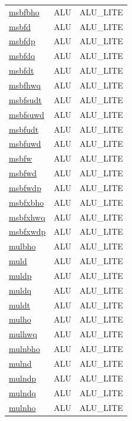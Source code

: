 \begin{small}
\begin{longtable}[l]{l l l}
\hyperlink{lvx.msbfbho}{msbfbho} & ALU & ALU\_LITE \\ 
\hyperlink{lvx.msbfd}{msbfd} & ALU & ALU\_LITE \\ 
\hyperlink{lvx.msbfdp}{msbfdp} & ALU & ALU\_LITE \\ 
\hyperlink{lvx.msbfdq}{msbfdq} & ALU & ALU\_LITE \\ 
\hyperlink{lvx.msbfdt}{msbfdt} & ALU & ALU\_LITE \\ 
\hyperlink{lvx.msbfhwq}{msbfhwq} & ALU & ALU\_LITE \\ 
\hyperlink{lvx.msbfsudt}{msbfsudt} & ALU & ALU\_LITE \\ 
\hyperlink{lvx.msbfsuwd}{msbfsuwd} & ALU & ALU\_LITE \\ 
\hyperlink{lvx.msbfudt}{msbfudt} & ALU & ALU\_LITE \\ 
\hyperlink{lvx.msbfuwd}{msbfuwd} & ALU & ALU\_LITE \\ 
\hyperlink{lvx.msbfw}{msbfw} & ALU & ALU\_LITE \\ 
\hyperlink{lvx.msbfwd}{msbfwd} & ALU & ALU\_LITE \\ 
\hyperlink{lvx.msbfwdp}{msbfwdp} & ALU & ALU\_LITE \\ 
\hyperlink{lvx.msbfxbho}{msbfxbho} & ALU & ALU\_LITE \\ 
\hyperlink{lvx.msbfxhwq}{msbfxhwq} & ALU & ALU\_LITE \\ 
\hyperlink{lvx.msbfxwdp}{msbfxwdp} & ALU & ALU\_LITE \\ 
\hyperlink{lvx.mulbho}{mulbho} & ALU & ALU\_LITE \\ 
\hyperlink{lvx.muld}{muld} & ALU & ALU\_LITE \\ 
\hyperlink{lvx.muldp}{muldp} & ALU & ALU\_LITE \\ 
\hyperlink{lvx.muldq}{muldq} & ALU & ALU\_LITE \\ 
\hyperlink{lvx.muldt}{muldt} & ALU & ALU\_LITE \\ 
\hyperlink{lvx.mulho}{mulho} & ALU & ALU\_LITE \\ 
\hyperlink{lvx.mulhwq}{mulhwq} & ALU & ALU\_LITE \\ 
\hyperlink{lvx.mulnbho}{mulnbho} & ALU & ALU\_LITE \\ 
\hyperlink{lvx.mulnd}{mulnd} & ALU & ALU\_LITE \\ 
\hyperlink{lvx.mulndp}{mulndp} & ALU & ALU\_LITE \\ 
\hyperlink{lvx.mulndq}{mulndq} & ALU & ALU\_LITE \\ 
\hyperlink{lvx.mulnho}{mulnho} & ALU & ALU\_LITE \\ 

\end{longtable}
\end{small}
